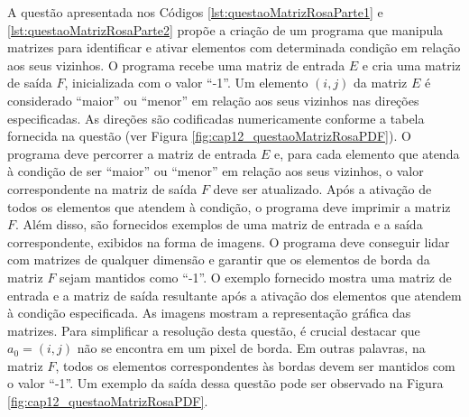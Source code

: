 
A questão apresentada nos Códigos \ref{lst:questaoMatrizRosaParte1} e \ref{lst:questaoMatrizRosaParte2} propõe a criação de um programa que manipula matrizes para identificar e ativar elementos com determinada condição em relação aos seus vizinhos. O programa recebe uma matriz de entrada \(E\) e cria uma matriz de saída \(F\), inicializada com o valor ``-1''. 
%
Um elemento \((i, j)\) da matriz \(E\) é considerado ``maior'' ou ``menor'' em relação aos seus vizinhos nas direções especificadas. As direções são codificadas numericamente conforme a tabela fornecida na questão (ver Figura \ref{fig:cap12_questaoMatrizRosaPDF}).
%
O programa deve percorrer a matriz de entrada \(E\) e, para cada elemento que atenda à condição de ser ``maior'' ou ``menor'' em relação aos seus vizinhos, o valor correspondente na matriz de saída \(F\) deve ser atualizado.
%
Após a ativação de todos os elementos que atendem à condição, o programa deve imprimir a matriz \(F\). Além disso, são fornecidos exemplos de uma matriz de entrada e a saída correspondente, exibidos na forma de imagens.
%
O programa deve conseguir lidar com matrizes de qualquer dimensão e garantir que os elementos de borda da matriz \(F\) sejam mantidos como ``-1''.
%
O exemplo fornecido mostra uma matriz de entrada e a matriz de saída resultante após a ativação dos elementos que atendem à condição especificada. As imagens mostram a representação gráfica das matrizes.
%
Para simplificar a resolução desta questão, é crucial destacar que \(a_0 = (i, j)\) não se encontra em um pixel de borda. Em outras palavras, na matriz \(F\), todos os elementos correspondentes às bordas devem ser mantidos com o valor ``-1''. Um exemplo da saída dessa questão pode ser observado na Figura \ref{fig:cap12_questaoMatrizRosaPDF}.


